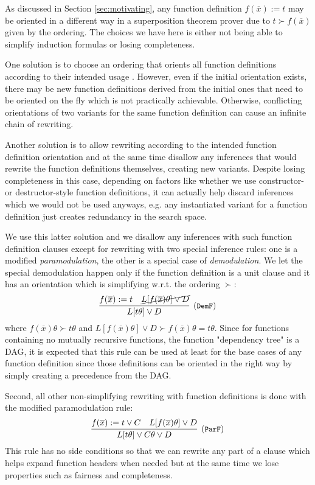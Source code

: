 
As discussed in Section \ref{sec:motivating}, any function definition $f(\overline{x}):= t$ may be oriented in a different way in a superposition theorem prover due to $t\succ f(\overline{x})$ given by the ordering. The choices we have here is either not being able to simplify induction formulas or losing completeness.

One solution is to choose an ordering that orients all function definitions according to their intended usage \cite{terminating}. However, even if the initial orientation exists, there may be new function definitions derived from the initial ones that need to be oriented on the fly which is not practically achievable. Otherwise, conflicting orientations of two variants for the same function definition can cause an infinite chain of rewriting.

Another solution is to allow rewriting according to the intended function definition orientation and at the same time disallow any inferences that would rewrite the function definitions themselves, creating new variants. Despite losing completeness in this case, depending on factors like whether we use constructor- or destructor-style function definitions, it can actually help discard inferences which we would not be used anyways, e.g. any instantiated variant for a function definition just creates redundancy in the search space.

We use this latter solution and we disallow any inferences with such function definition clauses except for rewriting with two special inference rules: one is a modified \textit{paramodulation}, the other is a special case of \textit{demodulation}. We let the special demodulation happen only if the function definition is a unit clause and it has an orientation which is simplifying w.r.t. the ordering $\succ$:
\begin{equation}
	\infer[\small{(\texttt{DemF})}]{L[t\theta]\lor D}
	{f(\overline{x}):=t & \cancel{L[f(\overline{x})\theta]\lor D}}
\end{equation}
where $f(\overline{x})\theta\succ t\theta$ and $L[f(\overline{x})\theta]\lor D\succ f(\overline{x})\theta=t\theta$. Since for functions containing no mutually recursive functions, the function "dependency tree" is a DAG, it is expected that this rule can be used at least for the base cases of any function definition since those definitions can be oriented in the right way by simply creating a precedence from the DAG.

Second, all other non-simplifying rewriting with function definitions is done with the modified paramodulation rule:
\begin{equation}
\infer[\small{(\texttt{ParF})}]{L[t\theta]\lor C\theta\lor D}{f(\overline{x}):=t\lor C & L[f(\overline{x})\theta]\lor D}
\end{equation}
This rule has no side conditions so that we can rewrite any part of a clause which helps expand function headers when needed but at the same time we lose properties such as fairness and completeness.

